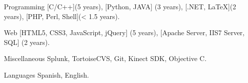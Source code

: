 


\begin{cvskills}


\cvskill
{Programming} %
{ [C/C++](5 years), [Python, JAVA] (3 years), [.NET, LaTeX](2 years), [PHP, Perl, Shell](< 1.5 years).}


\cvskill
{Web} %
{ [HTML5, CSS3, JavaScript, jQuery] (5 years), [Apache Server, IIS7 Server, SQL] (2 years).}



\cvskill
{Miscellaneous} %
{Splunk, TortoiseCVS, Git, Kinect SDK, Objective C.}


\cvskill
{Languages} %
{Spanish, English.} %


\end{cvskills}
